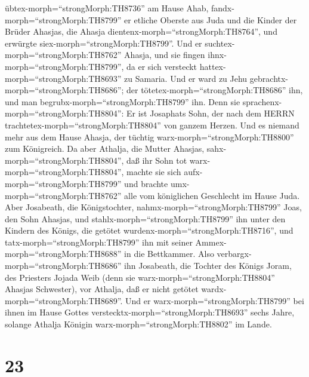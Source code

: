 übtex-morph=``strongMorph:TH8736'' am Hause Ahab,
fandx-morph=``strongMorph:TH8799'' er etliche Oberste aus Juda und die
Kinder der Brüder Ahasjas, die Ahasja
dientenx-morph=``strongMorph:TH8764'', und erwürgte
siex-morph=``strongMorph:TH8799''.  Und er
suchtex-morph=``strongMorph:TH8762'' Ahasja, und sie fingen
ihnx-morph=``strongMorph:TH8799'', da er sich versteckt
hattex-morph=``strongMorph:TH8693'' zu Samaria. Und er ward zu Jehu
gebrachtx-morph=``strongMorph:TH8686''; der
tötetex-morph=``strongMorph:TH8686'' ihn, und man
begrubx-morph=``strongMorph:TH8799'' ihn. Denn sie
sprachenx-morph=``strongMorph:TH8804'': Er ist Josaphats Sohn, der nach
dem HERRN trachtetex-morph=``strongMorph:TH8804'' von ganzem Herzen. Und
es niemand mehr aus dem Hause Ahasja, der tüchtig
warx-morph=``strongMorph:TH8800'' zum Königreich.  Da aber
Athalja, die Mutter Ahasjas, sahx-morph=``strongMorph:TH8804'', daß ihr
Sohn tot warx-morph=``strongMorph:TH8804'', machte sie sich
aufx-morph=``strongMorph:TH8799'' und brachte
umx-morph=``strongMorph:TH8762'' alle vom königlichen Geschlecht im
Hause Juda.  Aber Josabeath, die Königstochter,
nahmx-morph=``strongMorph:TH8799'' Joas, den Sohn Ahasjas, und
stahlx-morph=``strongMorph:TH8799'' ihn unter den Kindern des Königs,
die getötet wurdenx-morph=``strongMorph:TH8716'', und
tatx-morph=``strongMorph:TH8799'' ihn mit seiner
Ammex-morph=``strongMorph:TH8688'' in die Bettkammer. Also
verbargx-morph=``strongMorph:TH8686'' ihn Josabeath, die Tochter des
Königs Joram, des Priesters Jojada Weib (denn sie
warx-morph=``strongMorph:TH8804'' Ahasjas Schwester), vor Athalja, daß
er nicht getötet wardx-morph=``strongMorph:TH8689''.  Und
er warx-morph=``strongMorph:TH8799'' bei ihnen im Hause Gottes
verstecktx-morph=``strongMorph:TH8693'' sechs Jahre, solange Athalja
Königin warx-morph=``strongMorph:TH8802'' im Lande.

\hypertarget{section-22}{%
\section{23}\label{section-22}}

